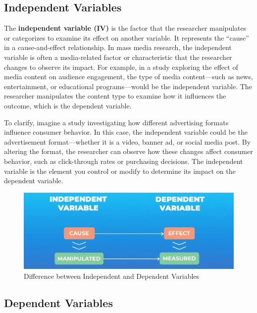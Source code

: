 \documentclass[
]{book}
\begin{document}
\subsection*{Independent Variables}\label{independent-variables}

The \textbf{independent variable (IV)} is the factor that the researcher manipulates or categorizes to examine its effect on another variable. It represents the ``cause'' in a cause-and-effect relationship. In mass media research, the independent variable is often a media-related factor or characteristic that the researcher changes to observe its impact. For example, in a study exploring the effect of media content on audience engagement, the type of media content---such as news, entertainment, or educational programs---would be the independent variable. The researcher manipulates the content type to examine how it influences the outcome, which is the dependent variable.

To clarify, imagine a study investigating how different advertising formats influence consumer behavior. In this case, the independent variable could be the advertisement format---whether it is a video, banner ad, or social media post. By altering the format, the researcher can observe how these changes affect consumer behavior, such as click-through rates or purchasing decisions. The independent variable is the element you control or modify to determine its impact on the dependent variable.

\begin{figure}
\centering
\includegraphics[width=1\textwidth,height=\textheight]{images/ind-dep.jpg}
\caption{Difference between Independent and Dependent Variables}
\end{figure}

\subsection*{Dependent Variables}\label{dependent-variables}
\end{document}
